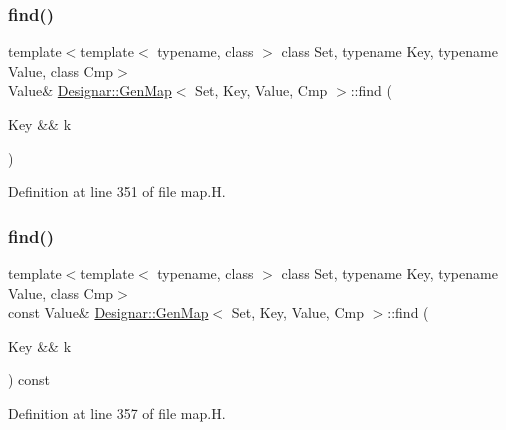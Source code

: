 \subsubsection{\texorpdfstring{find()}{find()}\hspace{0.1cm}{\footnotesize\ttfamily [3/4]}}
{\footnotesize\ttfamily template$<$template$<$ typename, class $>$ class Set, typename Key, typename Value, class Cmp$>$ \\
Value\& \hyperlink{class_designar_1_1_gen_map}{Designar\+::\+Gen\+Map}$<$ Set, Key, Value, Cmp $>$\+::find (\begin{DoxyParamCaption}\item[{Key \&\&}]{k }\end{DoxyParamCaption})\hspace{0.3cm}{\ttfamily [inline]}}



Definition at line 351 of file map.\+H.

\mbox{\label{class_designar_1_1_gen_map_a746797ad728a5e2aeefee11a8732a48f}} 
\subsubsection{\texorpdfstring{find()}{find()}\hspace{0.1cm}{\footnotesize\ttfamily [4/4]}}
{\footnotesize\ttfamily template$<$template$<$ typename, class $>$ class Set, typename Key, typename Value, class Cmp$>$ \\
const Value\& \hyperlink{class_designar_1_1_gen_map}{Designar\+::\+Gen\+Map}$<$ Set, Key, Value, Cmp $>$\+::find (\begin{DoxyParamCaption}\item[{Key \&\&}]{k }\end{DoxyParamCaption}) const\hspace{0.3cm}{\ttfamily [inline]}}



Definition at line 357 of file map.\+H.

\mbox{\label{class_designar_1_1_gen_map_a33a00f9275b3ff7788bbd93c39c25c9f}} 
